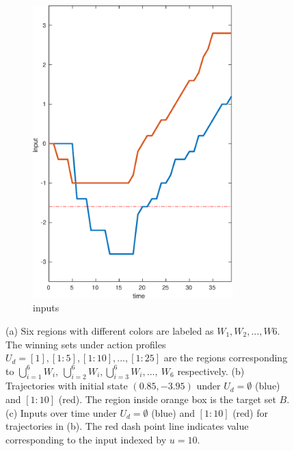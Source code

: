 \begin{figure}
\begin{subfigure}[b]{0.25\textwidth}
		\includegraphics[width=0.85\textwidth]{pic/input}
		\caption{inputs}
		\label{fig:input}
	\end{subfigure}
	\caption{(a) Six regions with different colors are labeled as $ W_1,W_2,...,W6 $. The winning sets under action profiles $U_d = [1], [1:5],[1:10],...,[1:25]$ are the regions corresponding to $ \bigcup_{i=1}^6 W_i,\ \bigcup_{i=2}^6 W_i,\bigcup_{i=3}^6 W_i,...,\ W_6 $ respectively. (b) Trajectories with initial state $ (0.85,-3.95) $ under $ U_d = \emptyset $ (blue) and $[1:10] $ (red). The region inside orange box is the target set $ B $. (c) Inputs over time under $ U_d = \emptyset $ (blue) and $ [1:10] $ (red) for trajectories in (b). The red dash point line indicates value corresponding to the input {\color{teal}indexed by} $ u = 10 $.} %
\end{figure}


